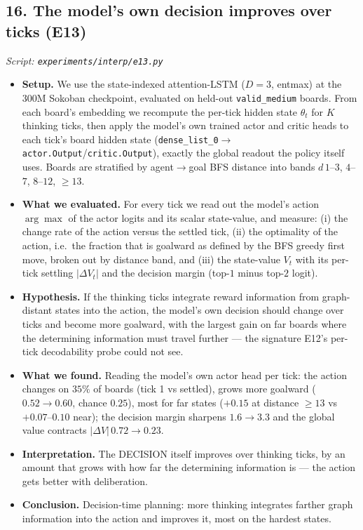 \documentclass[11pt]{article}
\begin{document}
\subsection*{16. The model's own decision improves over ticks (E13)}
\textit{Script: \texttt{experiments/interp/e13.py}}
\begin{itemize}
\item \textbf{Setup.} We use the state-indexed attention-LSTM ($D=3$, entmax) at the $300$M Sokoban checkpoint, evaluated on held-out \texttt{valid\_medium} boards. From each board's embedding we recompute the per-tick hidden state $\theta_t$ for $K$ thinking ticks, then apply the model's own trained actor and critic heads to each tick's board hidden state (\texttt{dense\_list\_0}$\to$\texttt{actor.Output}/\texttt{critic.Output}), exactly the global readout the policy itself uses. Boards are stratified by agent$\to$goal BFS distance into bands $d\,1$--$3$, $4$--$7$, $8$--$12$, $\geq 13$.
\item \textbf{What we evaluated.} For every tick we read out the model's action $\arg\max$ of the actor logits and its scalar state-value, and measure: (i) the change rate of the action versus the settled tick, (ii) the optimality of the action, i.e.\ the fraction that is goalward as defined by the BFS greedy first move, broken out by distance band, and (iii) the state-value $V_t$ with its per-tick settling $|\Delta V_t|$ and the decision margin (top-$1$ minus top-$2$ logit).
\item \textbf{Hypothesis.} If the thinking ticks integrate reward information from graph-distant states into the action, the model's own decision should change over ticks and become more goalward, with the largest gain on far boards where the determining information must travel further --- the signature E12's per-tick decodability probe could not see.
\item \textbf{What we found.} Reading the model's own actor head per tick: the action changes on $35\%$ of boards (tick 1 vs settled), grows more goalward ($0.52\to0.60$, chance $0.25$), most for far states ($+0.15$ at distance $\geq13$ vs $+0.07$--$0.10$ near); the decision margin sharpens $1.6\to3.3$ and the global value contracts $|\Delta V|\,0.72\to0.23$.
\item \textbf{Interpretation.} The DECISION itself improves over thinking ticks, by an amount that grows with how far the determining information is --- the action gets better with deliberation.
\item \textbf{Conclusion.} Decision-time planning: more thinking integrates farther graph information into the action and improves it, most on the hardest states.
\end{itemize}
\clearpage
\end{document}

